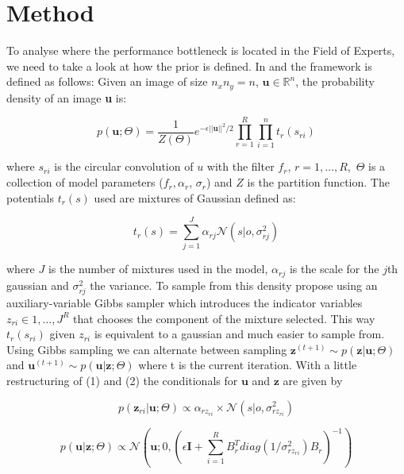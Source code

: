 \documentclass{article}
\begin{document}
\section{Method}

To analyse where the performance bottleneck is located in the Field of 
Experts, we need to take a look at how the prior is defined. In
\citep{stefan} and \citep{uwe} the framework is defined as follows: 
Given an image of size $n_x n_y = n$, $\textbf{u} \in \mathbb{R}^n$, the 
probability density of an image \textbf{u} is:

\begin{equation}
	p(\textbf{u}; \Theta) = 
	\frac{1}{Z(\Theta)}e^{-\epsilon||\textbf{u}||^2/2} \prod_{r=1}^{R} 
	\prod_{i=1}^{n} t_r(s_{ri})
\end{equation}

where $s_{ri}$ is the circular convolution of $u$ with the filter $f_r$, 
$r = 1, \ldots , R$, $\,\Theta$ is a collection of model parameters 
($f_r, \alpha_r$, $\sigma_r$) and $Z$ is the partition function.  The 
potentials $t_r(s)$ used are mixtures of Gaussian defined as:

\begin{equation}
	t_r(s) = \sum_{j=1}^{J} \alpha_{rj}\mathcal{N}(s|o, \sigma^2_{rj})
\end{equation}

where $J$ is the number of mixtures used in the model, $\alpha_{rj}$ is 
the scale for the $j$th gaussian and $\sigma^2_{rj}$ the variance. To 
sample from this density \citep{uwe} propose using an auxiliary-variable 
Gibbs sampler which introduces the indicator variables $z_{ri} \in {1, 
\ldots, J}^R$ that chooses the component of the mixture selected.  This 
way $t_r(s_{ri})$ given $z_{ri}$ is equivalent to a gaussian and much 
easier to sample from. Using Gibbs sampling we can alternate between 
sampling $\textbf{z}^{(t + 1)} \sim p(\textbf{z}|\textbf{u};\Theta)$ and 
$\textbf{u}^{(t + 1)} \sim p(\textbf{u}|\textbf{z};\Theta)$ where t is 
the current iteration.  With a little restructuring of (1) and (2) the 
conditionals for $\textbf{u}$
and $\textbf{z}$ are given by

\begin{equation}
	p(\textbf{z}_{ri}|\textbf{u};\Theta) \propto \alpha_{rz_{ri}} \times 
	\mathcal{N}(s|o, \sigma^2_{rz_{ri}})
\end{equation}

\begin{equation}
	p(\textbf{u}|\textbf{z};\Theta) \propto \mathcal{N}\left(\textbf{u}; 
	0, \left( \epsilon \textbf{I} + \sum_{i=1}^{R}B_r^T 
	diag(1/\sigma^2_{rz_{ri}}) B_r \right)^{-1} \right)
\end{equation}
\end{document}
